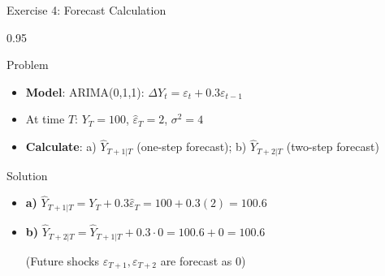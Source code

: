 \documentclass[9pt, aspectratio=169, t]{beamer}
\begin{document}
\begin{frame}{Exercise 4: Forecast Calculation}
    \begin{cminipage}{0.95\textwidth}
    \begin{alertblock}{Problem}
        \begin{itemize}\setlength{\itemsep}{0pt}
            \item \textbf{Model}: ARIMA(0,1,1): $\Delta Y_t = \varepsilon_t + 0.3\varepsilon_{t-1}$
            \item At time $T$: $Y_T = 100$, $\hat{\varepsilon}_T = 2$, $\sigma^2 = 4$
            \item \textbf{Calculate}: a) $\hat{Y}_{T+1|T}$ (one-step forecast); b) $\hat{Y}_{T+2|T}$ (two-step forecast)
        \end{itemize}
    \end{alertblock}

    \vspace{0.2cm}
    \begin{exampleblock}{Solution}
        \begin{itemize}\setlength{\itemsep}{0pt}
            \item \textbf{a)} $\hat{Y}_{T+1|T} = Y_T + 0.3\hat{\varepsilon}_T = 100 + 0.3(2) = \mathbf{100.6}$
            \item \textbf{b)} $\hat{Y}_{T+2|T} = \hat{Y}_{T+1|T} + 0.3 \cdot 0 = 100.6 + 0 = \mathbf{100.6}$

            (Future shocks $\varepsilon_{T+1}, \varepsilon_{T+2}$ are forecast as 0)
        \end{itemize}
    \end{exampleblock}
    \end{cminipage}
\end{frame}
\end{document}
